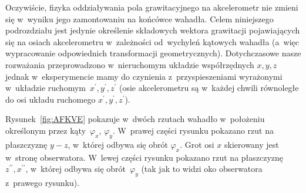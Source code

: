 \documentclass[paper=a4,DIV=12]{tmmlab}
\begin{document}
\begin{appendices}
Oczywiście, fizyka oddziaływania pola grawitacyjnego na akcelerometr nie zmieni
się w~wyniku jego zamontowaniu na końcówce wahadła. Celem niniejszego
podrozdziału jest jedynie określenie składowych wektora grawitacji
pojawiających się na osiach akcelerometru w~zależności od~wychyleń kątowych
wahadła (a~więc wypracowanie odpowiednich transformacji geometrycznych).
Dotychczasowe nasze rozważania przeprowadzono w~nieruchomym układzie
współrzędnych $x,y,z$ jednak w~eksperymencie mamy do czynienia
z~przyspieszeniami wyrażonymi w~układzie
ruchomym~$x^{\prime},y^{\prime},z^{\prime}$ (osie akcelerometru są w~każdej
chwili równoległe do osi układu ruchomego $x^{\prime},y^{\prime},z^{\prime}$).

Rysunek~\ref{fig:AFKVE} pokazuje w~dwóch rzutach wahadło w~położeniu określonym
przez kąty~$\varphi_x$, $\varphi_y$. W~prawej części rysunku pokazano rzut
na płaszczyznę $y-z$, w~której odbywa się obrót $\varphi_x$. Grot osi $x$
skierowany jest w~stronę obserwatora. W~lewej części rysunku pokazano rzut na
płaszczyznę~$z^{\prime\prime}, x^{\prime\prime}$, w~której odbywa się
obrót~$\varphi_y$ (tak jak to widzi oko obserwatora z~prawego rysunku).
\begin{figure}[htbp]
  \centering
\end{figure}
\end{appendices}
\end{document}
